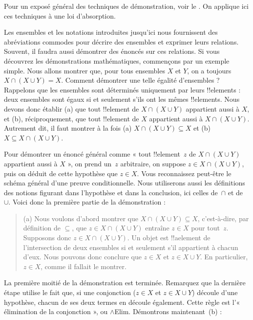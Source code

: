 \documentclass[../../../include/open-logic-section]{subfiles}
\begin{document}

\begin{editorial}
Pour un exposé général des techniques de démonstration,
voir le .
On applique ici ces techniques à une loi d'absorption.
%
%
\end{editorial}

\begin{explain}
Les ensembles et les notations introduites jusqu'ici nous fournissent
des abréviations commodes pour décrire des ensembles et exprimer leurs
relations. Souvent, il faudra aussi démontrer des énoncés sur ces
relations. Si vous découvrez les démonstrations mathématiques,
commençons par un exemple simple. Nous allons montrer que, pour
tous ensembles $X$ et $Y$, on a toujours $X\cap(X\cup Y)=X$.
Comment démontrer une telle
égalité d'ensembles ? Rappelons que les ensembles sont déterminés
uniquement par leurs !!{element}s : deux ensembles sont égaux si et
seulement s'ils ont les mêmes !!{element}s. Nous devons donc établir
(a) que tout !!{element} de $X\cap(X\cup Y)$ appartient aussi à $X$,
et (b), réciproquement, que tout !!{element} de $X$ appartient aussi
à $X\cap(X\cup Y)$. Autrement dit, il faut montrer à la fois
(a) $X\cap(X\cup Y)\subseteq X$ et
(b) $X\subseteq X\cap(X\cup Y)$.

Pour démontrer un énoncé général comme « tout !!{element}~$z$ de
$X\cap(X\cup Y)$ appartient aussi à $X$ », on prend un~$z$
arbitraire, on suppose $z\in X\cap(X\cup Y)$, puis on déduit de cette
hypothèse que $z\in X$. Vous reconnaissez peut-être le schéma général
d'une preuve conditionnelle. Nous utiliserons aussi les définitions
des notions figurant dans l'hypothèse et dans la conclusion, ici
celles de~$\cap$ et de~$\cup$. Voici donc la première partie de la
démonstration :

\begin{quote}
(a) Nous voulons d'abord montrer que
$X\cap(X\cup Y)\subseteq X$, c'est-à-dire, par définition de
$\subseteq$, que $z\in X\cap(X\cup Y)$ entraîne $z\in X$ pour
tout~$z$. Supposons donc $z\in X\cap(X\cup Y)$. Un objet est
!!a{element} de l'intersection de deux ensembles si et seulement
s'il appartient à chacun d'eux. Nous pouvons donc conclure que
$z\in X$ et $z\in X\cup Y$. En particulier, $z\in X$, comme il
fallait le montrer.
\end{quote}

La première moitié de la démonstration est terminée. Remarquez que
la dernière étape utilise le fait que, si une conjonction
($z\in X$ et $z\in X\cup Y$) découle d'une hypothèse, chacun de ses
deux termes en découle également. Cette règle est l'« élimination de
la conjonction », ou $\land$Elim. Démontrons maintenant~(b) :


\end{explain}
\end{document}
